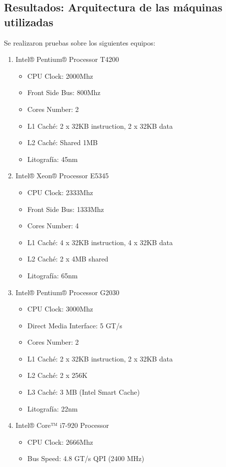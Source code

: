 \subsection{Resultados: Arquitectura de las máquinas utilizadas}
Se realizaron pruebas sobre los siguientes equipos:
\begin{enumerate}
	\item Intel® Pentium® Processor T4200
			\begin{itemize}
				\item CPU Clock: 2000Mhz
				\item Front Side Bus: 800Mhz
				\item Cores Number: 2
				\item L1 Caché: 2 x 32KB instruction, 2 x 32KB data
				\item L2 Caché: Shared 1MB
				\item Litografía: 45nm
			\end{itemize}
	\item Intel® Xeon® Processor E5345 
			\begin{itemize}
				\item CPU Clock: 2333Mhz
				\item Front Side Bus: 1333Mhz
				\item Cores Number: 4
				\item L1 Caché: 4 x 32KB instruction, 4 x 32KB data
				\item L2 Caché: 2 x 4MB shared
				\item Litografía: 65nm
			\end{itemize}
	\item Intel® Pentium® Processor G2030
			\begin{itemize}
				\item CPU Clock: 3000Mhz
				\item Direct Media Interface: 5 GT/s
				\item Cores Number: 2
				\item L1 Caché: 2 x 32KB instruction, 2 x 32KB data
				\item L2 Caché: 2 x 256K
				\item L3 Caché: 3 MB (Intel Smart Cache)
				\item Litografía: 22nm
			\end{itemize}
	\item Intel® Core™ i7-920 Processor 
			\begin{itemize}
				\item CPU Clock: 2666Mhz
				\item Bus Speed: 4.8 GT/s QPI (2400 MHz)

\end{itemize}
\end{enumerate}
